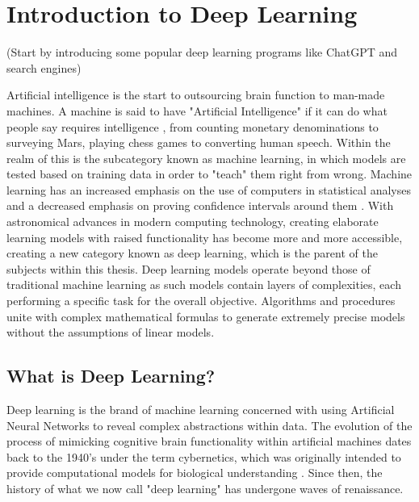 \chapter{Introduction to Deep Learning}

(Start by introducing some popular deep learning programs like ChatGPT and search engines)

Artificial intelligence is the start to outsourcing brain function to man-made machines.  A machine is said to have "Artificial Intelligence" if it can do what people say requires intelligence \cite{jackson2019introduction}, from counting monetary denominations to surveying Mars, playing chess games to converting human speech.  Within the realm of this is the subcategory known as machine learning, in which models are tested based on training data in order to "teach" them right from wrong.  Machine learning has an increased emphasis on the use of computers in statistical analyses and a decreased emphasis on proving confidence intervals around them \cite{Goodfellow-et-al-2016}.  With astronomical advances in modern computing technology, creating elaborate learning models with raised functionality has become more and more accessible, creating a new category known as deep learning, which is the parent of the subjects within this thesis.  Deep learning models operate beyond those of traditional machine learning as such models contain layers of complexities, each performing a specific task for the overall objective.  Algorithms and procedures unite with complex mathematical formulas to generate extremely precise models without the assumptions of linear models.



\section{What is Deep Learning?} %

Deep learning is the brand of machine learning concerned with using Artificial Neural Networks to reveal complex abstractions within data.
The evolution of the process of mimicking cognitive brain functionality within artificial machines dates back to the 1940's under the term cybernetics, which was originally intended to provide computational models for biological understanding \cite{Goodfellow-et-al-2016}.  Since then, the history of what we now call "deep learning" has undergone waves of renaissance.

